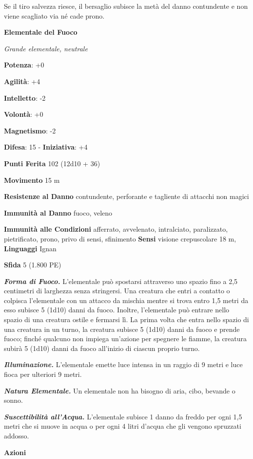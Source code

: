 \begin{multicols}{2}
Se il tiro salvezza riesce, il bersaglio subisce la metà del danno
contundente e non viene scagliato via né cade prono.

\textbf{Elementale del Fuoco}

\emph{Grande elementale, neutrale}

\textbf{Potenza}: +0

\textbf{Agilità}: +4

\textbf{Intelletto}: -2

\textbf{Volontà}: +0

\textbf{Magnetismo}: -2

\textbf{Difesa}: 15 - \textbf{Iniziativa}: +4

\textbf{Punti Ferita} 102 (12d10 + 36)

\textbf{Movimento} 15 m

\textbf{Resistenze al Danno} contundente, perforante e tagliente di
attacchi non magici

\textbf{Immunità al Danno} fuoco, veleno

\textbf{Immunità alle Condizioni} afferrato, avvelenato, intralciato,
paralizzato, pietrificato, prono, privo di sensi, sfinimento
\textbf{Sensi} visione crepuscolare 18 m, 
\textbf{Linguaggi} Ignan

\textbf{Sfida} 5 (1.800 PE)

\emph{\textbf{Forma di Fuoco.}} L'elementale può spostarsi attraverso
uno spazio fino a 2,5 centimetri di larghezza senza stringersi. Una
creatura che entri a contatto o colpisca l'elementale con un attacco da
mischia mentre si trova entro 1,5 metri da esso subisce 5 (1d10) danni
da fuoco. Inoltre, l'elementale può entrare nello spazio di una creatura
ostile e fermarsi lì. La prima volta che entra nello spazio di una
creatura in un turno, la creatura subisce 5 (1d10) danni da fuoco e
prende fuoco; finché qualcuno non impiega un'azione per spegnere le
fiamme, la creatura subirà 5 (1d10) danni da fuoco all'inizio di ciascun
proprio turno.

\emph{\textbf{Illuminazione.}} L'elementale emette luce intensa in un
raggio di 9 metri e luce fioca per ulteriori 9 metri.

\emph{\textbf{Natura Elementale.}} Un elementale non ha bisogno di aria,
cibo, bevande o sonno.

\emph{\textbf{Suscettibilità all'Acqua.}} L'elementale subisce 1 danno
da freddo per ogni 1,5 metri che si muove in acqua o per ogni 4 litri
d'acqua che gli vengono spruzzati addosso.

\textbf{Azioni}


\end{multicols}
